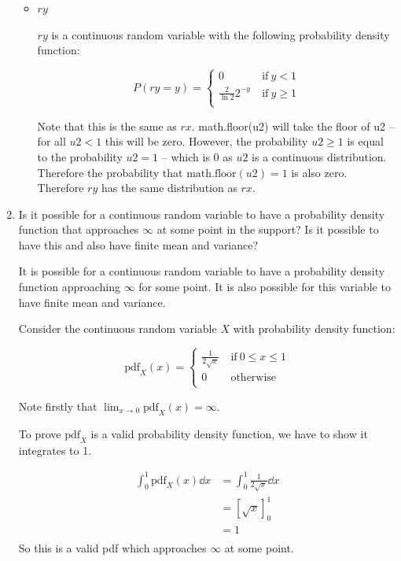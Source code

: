 \documentclass[10pt,\jkfside,a4paper]{article}
\begin{document}
\begin{enumerate}[label=\arabic*]
\begin{itemize}
\item $ry$

$ry$ is a continuous random variable with the following probability density
function:

\[
P(ry = y) =
\begin{cases}
0 & \ \text{if} \ y < 1 \\
\frac{2}{\ln 2} 2^{-y} & \ \text{if} \ y \geq 1 \\
\end{cases}
\]

Note that this is the same as $rx$. math.floor(u2) will take the floor of
u2 -- for all $u2 < 1$ this will be zero. However, the probability $u2 \geq
1$ is equal to the probability $u2 = 1$ -- which  is 0 as $u2$ is a
continuous distribution. Therefore the probability that $\text{math.floor}
(u2) = 1$ is also zero. Therefore $ry$ has the same distribution as $rx$.

\end{itemize}

\item Is it possible for a continuous random variable to have a probability
density function that approaches $\infty$ at some point in the support? Is
it possible to have this and also have finite mean and variance?

It is possible for a continuous random variable to have a probability
density function approaching $\infty$ for some point. It is also possible
for this variable to have finite mean and variance.

Consider the continuous random variable $X$ with probability density function:

\[
\text{pdf}_X(x) =
\begin{cases}
\frac{1}{2\sqrt{x}} & \ \text{if} \ 0 \leq x \leq 1 \\
0 & \ \text{otherwise} \\
\end{cases}
\]

Note firstly that $\lim_{x\rightarrow 0} \text{pdf}_X(x) = \infty$.

To prove $\text{pdf}_X$ is a valid probability density function, we have to
show it integrates to 1.

\[
\begin{split}
\int^1_0 \text{pdf}_X(x) \dd{x} &= \int^1_0 \frac{1}{2\sqrt{x}} \dd{x} \\
&= \left[ \sqrt{x} \right]^1_0 \\
&= 1 \\
\end{split}
\]
So this is a valid pdf which approaches $\infty$ at some point.


\end{enumerate}
\end{document}
